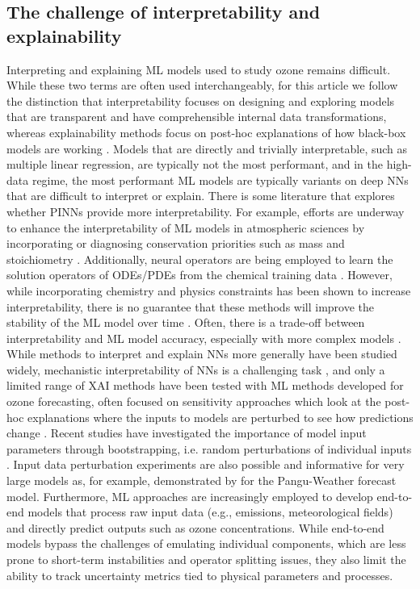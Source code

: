 \documentclass[gmd, manuscript]{copernicus}
\begin{document}
\subsection{The challenge of interpretability and explainability}
Interpreting and explaining ML models used to study ozone remains difficult. While these two terms are often used interchangeably, for this article we follow the distinction that interpretability focuses on designing and exploring models that are transparent and have comprehensible internal data transformations, whereas explainability methods focus on post-hoc explanations of how black-box models are working \citep{Rudin2019}. Models that are directly and trivially interpretable, such as multiple linear regression, are typically not the most performant, and in the high-data regime, the most performant ML models are typically variants on deep NNs that are difficult to interpret or explain. There is some literature that explores whether PINNs provide more interpretability. For example, efforts are underway to enhance the interpretability of ML models in atmospheric sciences by incorporating or diagnosing conservation priorities such as mass and stoichiometry \citep{sturm_mass-_2020, sturm_conservation_2022}. Additionally, neural operators are being employed to learn the solution operators of ODEs/PDEs from the chemical training data \citep{liu_neural_2024}. However, while incorporating chemistry and physics constraints has been shown to increase interpretability, there is no guarantee that these methods will improve the stability of the ML model over time \citep{sturm_advecting_2023}. Often, there is a trade-off between interpretability and ML model accuracy, especially with more complex models \citep{sengupta_balancing_2023}.
While methods to interpret and explain NNs more generally have been studied widely, mechanistic interpretability of NNs is a challenging task \citep{Nanda2023}, and only a limited range of XAI methods have been tested with ML methods developed for ozone forecasting, often focused on sensitivity approaches which look at the post-hoc explanations where the inputs to models are perturbed to see how predictions change \citep{Ivanovs2021}. Recent studies have investigated the importance of model input parameters through bootstrapping, i.e. random perturbations of individual inputs \citep{Kleinert2021}. Input data perturbation experiments are also possible and informative for very large models as, for example, demonstrated by \citet{Hakim2024} for the Pangu-Weather forecast model. Furthermore, ML approaches are increasingly employed to develop end-to-end models that process raw input data (e.g., emissions, meteorological fields) and directly predict outputs such as ozone concentrations. While end-to-end models bypass the challenges of emulating individual components, which are less prone to short-term instabilities and operator splitting issues, they also limit the ability to track uncertainty metrics tied to physical parameters and processes. 
\end{document}

